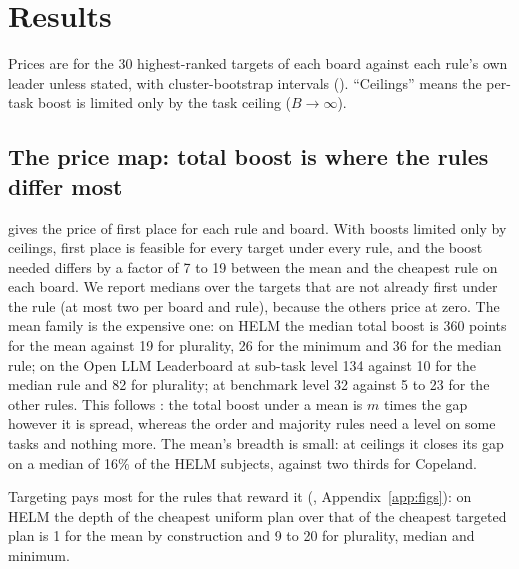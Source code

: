 \section{Results}
\label{sec:results}

Prices are for the 30 highest-ranked targets of each board against each rule's own leader unless stated, with cluster-bootstrap intervals (). ``Ceilings'' means the per-task boost is limited only by the task ceiling ($B\to\infty$).

\subsection{The price map: total boost is where the rules differ most}
\label{sec:pricemap}

 gives the price of first place for each rule and board. With boosts limited only by ceilings, first place is feasible for every target under every rule, and the boost needed differs by a factor of 7 to 19 between the mean and the cheapest rule on each board. We report medians over the targets that are not already first under the rule (at most two per board and rule), because the others price at zero. The mean family is the expensive one: on HELM the median total boost is 360 points for the mean against 19 for plurality, 26 for the minimum and 36 for the median rule; on the Open LLM Leaderboard at sub-task level 134 against 10 for the median rule and 82 for plurality; at benchmark level 32 against 5 to 23 for the other rules. This follows : the total boost under a mean is $m$ times the gap however it is spread, whereas the order and majority rules need a level on some tasks and nothing more. The mean's breadth is small: at ceilings it closes its gap on a median of 16\% of the HELM subjects, against two thirds for Copeland.

Targeting pays most for the rules that reward it (, Appendix~\ref{app:figs}): on HELM the depth of the cheapest uniform plan over that of the cheapest targeted plan is 1 for the mean by construction and 9 to 20 for plurality, median and minimum.

\begin{table}[t]
\centering
\caption{Price of first place at ceilings (medians over the 30 highest-ranked targets not yet first, own leader): total boost in points, breadth fraction $k/m$ and minimal feasible per-task budget $B^\ast$ in points. $\dagger$: some solver runs did not close (gap above $10^{-4}$); the cell is an upper bound.}
\label{tab:price}

\end{table}

